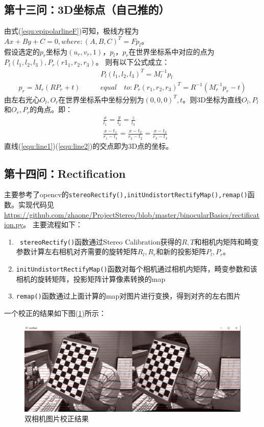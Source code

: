 \documentclass[UTF8]{ctexart}
\begin{document}
\subsection{第十三问：3D坐标点（自己推的）}
由式(\ref{equ:epipolarlineF})可知，极线方程为$Ax+By+C=0, where:(A,B,C)^T=Fp_l$。\\
假设选定的$p_r$坐标为$(u_r,v_r,1)$，$p_l，p_r$在世界坐标系中对应的点为$P_l(l_1,l_2,l_3),P_r(r1_1,r_2,r_3)$。 则有以下公式成立：
\begin{align}
&P_l(l_1,l_2,l_3)^T=M_l^{-1}p_l\\
p_r=M_r(RP_r+t) \qquad &equal\quad to: P_r(r_1,r_2,r_3)^T=R^{-1}(M_r^{-1}p_r-t)
\end{align}
由左右光心$O_l,O_r$在世界坐标系中坐标分别为$(0,0,0)^T,t$。则3D坐标为直线$O_l,P_l$和$O_r,P_r$的角点。即：
\begin{align}
&\frac{x}{l_1}=\frac{y}{l_2}=\frac{z}{l_3}\label{equ:line1}\\
&\frac{x-t_1}{r_1-t_1}=\frac{x-t_2}{r_2-t_2}=\frac{x-t_3}{r_3-t_3}\label{equ:line2}
\end{align}
直线(\ref{equ:line1})(\ref{equ:line2})的交点即为3D点的坐标。
\subsection{第十四问：Rectification}
主要参考了opencv的\verb"stereoRectify(),initUndistortRectifyMap(),remap()"函数\cite{opencvCameraCalibrationl18830}。实现代码见\url{https://github.com/zhaone/ProjectStereo/blob/master/binocularBasics/rectification.py}。 主要流程如下：
\begin{enumerate}
  \item\verb" stereoRectify()"函数通过Stereo Calibration获得的$R,T$和相机内矩阵和畸变参数计算左右相机对齐需要的旋转矩阵$R_l,R_r$和新的投影矩阵$P_l,P_r$。
  \item\verb"initUndistortRectifyMap()"函数对每个相机通过相机内矩阵，畸变参数和该相机的旋转矩阵，投影矩阵计算像素转换的map
  \item\verb"remap()"函数通过上面计算的map对图片进行变换，得到对齐的左右图片
\end{enumerate}
一个校正的结果如下图(\ref{fig:Rectification})所示：
\begin{figure}[htp]%
	\centering  %
	\includegraphics[width=0.9\linewidth]{./figures/rectified.jpg} %
	\caption{双相机图片校正结果}  %
	\label{fig:Rectification}   %
\end{figure}\\
\end{document}
